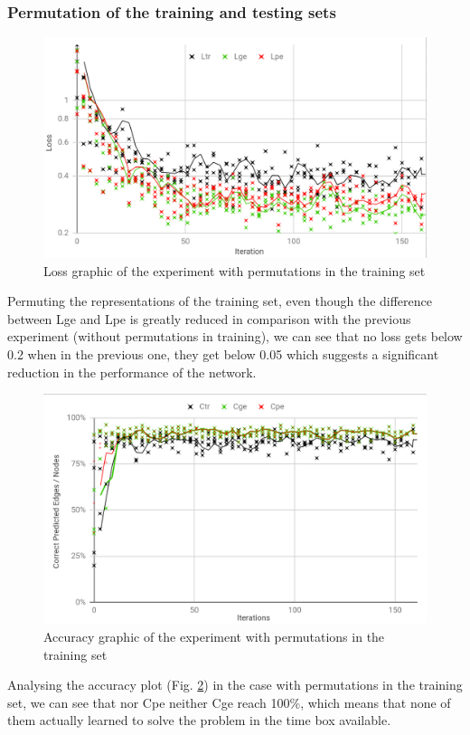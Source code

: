 \subsubsection {Permutation of the training and testing sets}

\begin{figure}[H]
    \centering
    \includegraphics[width=.9\linewidth]
    {fig/content/results/shapes/permuted_training/loss.png}
    \caption{Loss graphic of the experiment with permutations in the training set}
    \label{fig:regions_separation_permuting_training_loss}
\end{figure}

Permuting the representations of the training set, even though the difference between Lge and Lpe is greatly reduced in comparison with the previous experiment (without permutations in training), we can see that no loss gets below 0.2 when in the previous one, they get below 0.05 which suggests a significant reduction in the performance of the network.

\begin{figure}[H]
    \centering
    \includegraphics[width=.9\linewidth]
    {fig/content/results/shapes/permuted_training/correct.png}
    \caption{Accuracy graphic of the experiment with permutations in the training set}
    \label{fig:regions_separation_permuting_training_accuracy}
\end{figure}

Analysing the accuracy plot (Fig. \ref{fig:regions_separation_permuting_training_accuracy}) in the case with permutations in the training set, we can see that nor Cpe neither Cge reach 100\%, which means that none of them actually learned to solve the problem in the time box available. 



